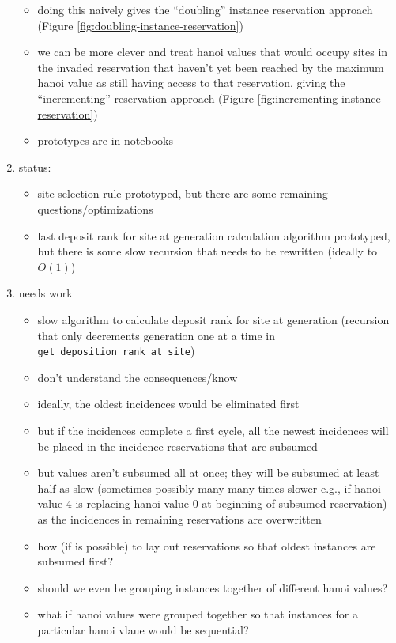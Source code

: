 \begin{enumerate}
\begin{itemize}
  \item doing this naively gives the ``doubling'' instance reservation approach (Figure \ref{fig:doubling-instance-reservation})
  \item we can be more clever and treat hanoi values that would occupy sites in the invaded reservation that haven't yet been reached by the maximum hanoi value as still having access to that reservation, giving the ``incrementing'' reservation approach (Figure \ref{fig:incrementing-instance-reservation})
  \item prototypes are in notebooks
\end{itemize}
\item status:
\begin{itemize}
  \item site selection rule prototyped, but there are some remaining questions/optimizations
  \item last deposit rank for site at generation calculation algorithm prototyped, but there is some slow recursion that needs to be rewritten (ideally to $O(1)$)
\end{itemize}
\item needs work
\begin{itemize}
  \item slow algorithm to calculate deposit rank for site at generation (recursion that only decrements generation one at a time in \texttt{get\_deposition\_rank\_at\_site})
  \item don't understand the consequences/know
  \item ideally, the oldest incidences would be eliminated first
  \item but if the incidences complete a first cycle, all the newest incidences will be placed in the incidence reservations that are subsumed
  \item but values aren't subsumed all at once; they will be subsumed at least half as slow (sometimes possibly many many times slower e.g., if hanoi value 4 is replacing hanoi value 0 at beginning of subsumed reservation) as the incidences in remaining reservations are overwritten
  \item how (if is possible) to lay out reservations so that oldest instances are subsumed first?
  \item should we even be grouping instances together of different hanoi values?
  \item what if hanoi values were grouped together so that instances for a particular hanoi vlaue would be sequential?
\end{itemize}
\end{enumerate}
